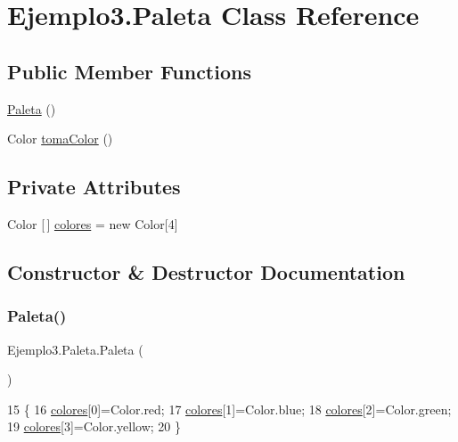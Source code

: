 \hypertarget{class_ejemplo3_1_1_paleta}{}\section{Ejemplo3.\+Paleta Class Reference}
\label{class_ejemplo3_1_1_paleta}
\subsection*{Public Member Functions}
\begin{DoxyCompactItemize}
\item 
\mbox{\hyperlink{class_ejemplo3_1_1_paleta_ae02c6db9154b429f89848f22c609f3d4}{Paleta}} ()
\item 
Color \mbox{\hyperlink{class_ejemplo3_1_1_paleta_aa20bc99fc1c973c324f038a8cb5012f8}{toma\+Color}} ()
\end{DoxyCompactItemize}
\subsection*{Private Attributes}
\begin{DoxyCompactItemize}
\item 
Color \mbox{[}$\,$\mbox{]} \mbox{\hyperlink{class_ejemplo3_1_1_paleta_a33e56a8007182e988e912a675af18fa5}{colores}} = new Color\mbox{[}4\mbox{]}
\end{DoxyCompactItemize}


\subsection{Constructor \& Destructor Documentation}
\mbox{\label{class_ejemplo3_1_1_paleta_ae02c6db9154b429f89848f22c609f3d4}} 
\subsubsection{\texorpdfstring{Paleta()}{Paleta()}}
{\footnotesize\ttfamily Ejemplo3.\+Paleta.\+Paleta (\begin{DoxyParamCaption}{ }\end{DoxyParamCaption})\hspace{0.3cm}{\ttfamily [inline]}}


\begin{DoxyCode}
15     \{
16         \mbox{\hyperlink{class_ejemplo3_1_1_paleta_a33e56a8007182e988e912a675af18fa5}{colores}}[0]=Color.red;
17         \mbox{\hyperlink{class_ejemplo3_1_1_paleta_a33e56a8007182e988e912a675af18fa5}{colores}}[1]=Color.blue;
18         \mbox{\hyperlink{class_ejemplo3_1_1_paleta_a33e56a8007182e988e912a675af18fa5}{colores}}[2]=Color.green;
19         \mbox{\hyperlink{class_ejemplo3_1_1_paleta_a33e56a8007182e988e912a675af18fa5}{colores}}[3]=Color.yellow;
20     \}
\end{DoxyCode}


